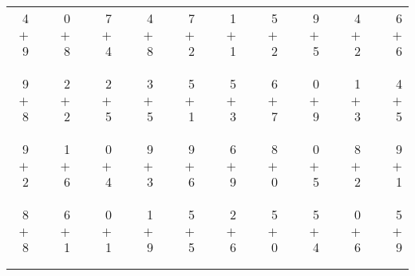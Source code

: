 \documentclass[12pt, letterpaper]{article}
\begin{document}
\begin{tabular}{rrrrrrrrrrrrrrrrrrr}
4 & & 0 & & 7 & & 4 & & 7 & & 1 & & 5 & & 9 & & 4 & & 6\\
$+$ 9 & & $+$ 8 & & $+$ 4 & & $+$ 8 & & $+$ 2 & & $+$ 1 & & $+$ 2 & & $+$ 5 & & $+$ 2 & & $+$ 6\\
\cline{1-1} \cline{3-3} \cline{5-5} \cline{7-7} \cline{9-9} \cline{11-11} \cline{13-13} \cline{15-15} \cline{17-17} \cline{19-19} \\ \\
9 & & 2 & & 2 & & 3 & & 5 & & 5 & & 6 & & 0 & & 1 & & 4\\
$+$ 8 & & $+$ 2 & & $+$ 5 & & $+$ 5 & & $+$ 1 & & $+$ 3 & & $+$ 7 & & $+$ 9 & & $+$ 3 & & $+$ 5\\
\cline{1-1} \cline{3-3} \cline{5-5} \cline{7-7} \cline{9-9} \cline{11-11} \cline{13-13} \cline{15-15} \cline{17-17} \cline{19-19} \\ \\
9 & & 1 & & 0 & & 9 & & 9 & & 6 & & 8 & & 0 & & 8 & & 9\\
$+$ 2 & & $+$ 6 & & $+$ 4 & & $+$ 3 & & $+$ 6 & & $+$ 9 & & $+$ 0 & & $+$ 5 & & $+$ 2 & & $+$ 1\\
\cline{1-1} \cline{3-3} \cline{5-5} \cline{7-7} \cline{9-9} \cline{11-11} \cline{13-13} \cline{15-15} \cline{17-17} \cline{19-19} \\ \\
8 & & 6 & & 0 & & 1 & & 5 & & 2 & & 5 & & 5 & & 0 & & 5\\
$+$ 8 & & $+$ 1 & & $+$ 1 & & $+$ 9 & & $+$ 5 & & $+$ 6 & & $+$ 0 & & $+$ 4 & & $+$ 6 & & $+$ 9\\
\cline{1-1} \cline{3-3} \cline{5-5} \cline{7-7} \cline{9-9} \cline{11-11} \cline{13-13} \cline{15-15} \cline{17-17} \cline{19-19} \\ \\
\end{tabular}
\newpage
\end{document}
